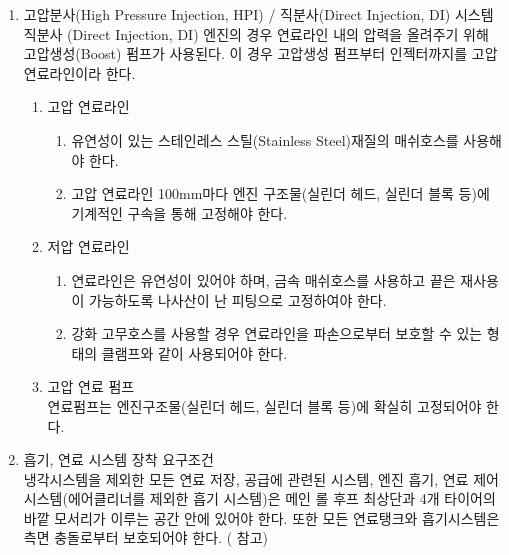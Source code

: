 \documentclass[final,a4paper,10pt]{report}
\begin{document}
\begin{enumerate}
  \item\label{rule:formula-technical.fuel-system.direct-injection} 고압분사(High Pressure Injection, HPI) / 직분사(Direct Injection, DI) 시스템\\
    직분사 (Direct Injection, DI) 엔진의 경우 연료라인 내의 압력을 올려주기 위해 고압생성(Boost) 펌프가 사용된다. 이 경우 고압생성 펌프부터 인젝터까지를 고압 연료라인이라 한다.

    \begin{enumerate}
      \item\label{rule:formula-technical.fuel-system.direct-injection.high-pressure-line} 고압 연료라인
        \begin{enumerate}
          \item\label{rule:formula-technical.fuel-system.direct-injection.high-pressure-line.stainless-mesh-hose} 유연성이 있는 스테인레스 스틸(Stainless Steel)재질의 매쉬호스를 사용해야 한다.
          \item\label{rule:formula-technical.fuel-system.direct-injection.high-pressure-line.fixed-every-100mm} 고압 연료라인 100mm마다 엔진 구조물(실린더 헤드, 실린더 블록 등)에 기계적인 구속을 통해 고정해야 한다.
        \end{enumerate}

      \item\label{rule:formula-technical.fuel-system.direct-injection.low-pressure-line} 저압 연료라인
        \begin{enumerate}
          \item\label{rule:formula-technical.fuel-system.direct-injection.low-pressure-line.metal-mesh-threaded-fittings} 연료라인은 유연성이 있어야 하며, 금속 매쉬호스를 사용하고 끝은 재사용이 가능하도록 나사산이 난 피팅으로 고정하여야 한다.
          \item\label{rule:formula-technical.fuel-system.direct-injection.low-pressure-line.reinforced-rubber-hose-clamp} 강화 고무호스를 사용할 경우 연료라인을 파손으로부터 보호할 수 있는 형태의 클램프와 같이 사용되어야 한다.
        \end{enumerate}

      \item\label{rule:formula-technical.fuel-system.direct-injection.high-pressure-pump-mounting} 고압 연료 펌프\\
        연료펌프는 엔진구조물(실린더 헤드, 실린더 블록 등)에 확실히 고정되어야 한다.
    \end{enumerate}

  \item\label{rule:formula-technical.fuel-system.mounting-envelope-side-impact} 흡기, 연료 시스템 장착 요구조건\\
    냉각시스템을 제외한 모든 연료 저장, 공급에 관련된 시스템, 엔진 흡기, 연료 제어 시스템(에어클리너를 제외한 흡기 시스템)은 메인 롤 후프 최상단과 4개 타이어의 바깥 모서리가 이루는 공간 안에 있어야 한다. 또한 모든 연료탱크와 흡기시스템은 측면 충돌로부터 보호되어야 한다. ( 참고)

\end{enumerate}
\end{document}
